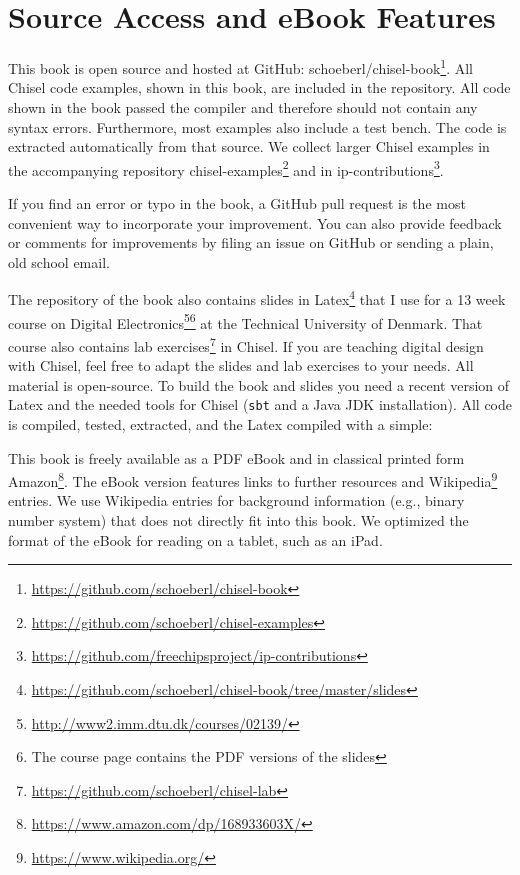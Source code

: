 \documentclass[%
    10pt,
    headinclude, footexclude,
    openright, %
    notitlepage,
    cleardoubleempty,
    headsepline,
    pointlessnumbers,
    bibtotoc, idxtotoc,
    ]{scrbook}
\newcommand{\code}[1]{{\lstinline[basicstyle=\small\ttfamily]{#1}}}
\newcommand{\myref}[2]{\href{#1}{#2}}
\renewcommand{\myref}[2]{{#2}{\footnote{\url{#1}}}}
\begin{document}
\section{Source Access and eBook Features}

This book is open source and hosted at GitHub: \myref{https://github.com/schoeberl/chisel-book}{schoeberl/chisel-book}.
All Chisel code examples, shown in this book, are included in the repository.
All code shown in the book passed the compiler and therefore should not contain any syntax errors.
Furthermore, most examples also include a test bench.
The code is extracted automatically from that source.
We collect larger Chisel examples in the accompanying repository
\myref{https://github.com/schoeberl/chisel-examples}{chisel-examples}
and in \myref{https://github.com/freechipsproject/ip-contributions}{ip-contributions}.

If you find an error or typo in the book, a GitHub pull request is the most convenient way to incorporate your improvement.
You can also provide feedback or comments for improvements by filing an issue on GitHub
or sending a plain, old school email.

The repository of the book also contains
\myref{https://github.com/schoeberl/chisel-book/tree/master/slides}{slides in Latex}
that I use for a 13 week course on
\myref{http://www2.imm.dtu.dk/courses/02139/}{Digital Electronics}\footnote{The course page
contains the PDF versions of the slides} at the Technical University of Denmark.
That course also contains \myref{https://github.com/schoeberl/chisel-lab}{lab exercises}
in Chisel.
If you are teaching digital design with Chisel, feel free to adapt the slides and lab
exercises to your needs. All material is open-source. To build the book and slides
you need a recent version of Latex and the needed tools for Chisel (\code{sbt} and
a Java JDK installation). All code is compiled, tested, extracted, and the Latex compiled with
a simple:


This book is freely available as a PDF eBook and in classical printed form
\myref{https://www.amazon.com/dp/168933603X/}{Amazon}.
The eBook version features links to further resources
and \myref{https://www.wikipedia.org/}{Wikipedia} entries.
We use Wikipedia entries for background information (e.g., binary number system)
that does not directly fit into this book.
We optimized the format of the eBook for reading on a tablet, such as an iPad.
\end{document}
